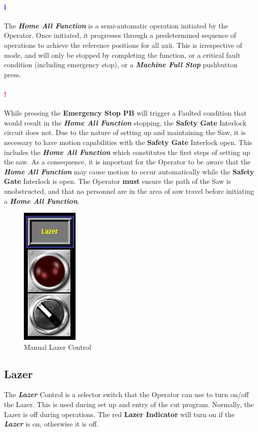 \paragraph*{\textbf{\LARGE \textcolor{blue}{i}}}The \textbf{\textit{Home All Function}} is a semi-automatic operation initiated by the Operator. Once initiated, it progresses through a predetermined sequence of operations to achieve the reference positions for all axii. This is irrespective of mode, and will only be stopped by completing the function, or a critical fault condition (including emergency stop), or a \textbf{\textit{Machine Full Stop}} pushbutton press.
\paragraph*{\textbf{{\LARGE \textcolor{red}{!}}}} While pressing the \textbf{Emergency Stop PB} will trigger a Faulted condition that would result in the \textbf{\textit{Home All Function}} stopping, the \textbf{Safety Gate} Interlock circuit does not. Due to the nature of setting up and maintaining the Saw, it is necessary to have motion capabilities with the \textbf{Safety Gate} Interlock open. This includes the \textbf{\textit{Home All Function}} which constitutes the first steps of setting up the saw. As a consequence, it is important for the Operator to be aware that the \textbf{\textit{Home All Function}} may cause motion to occur automatically while the \textbf{Safety Gate} Interlock is open. The Operator \textbf{must} ensure the path of the Saw is unobstructed, and that no personnel are in the area of saw travel before initiating a \textbf{\textit{Home All Function}}.
\pagebreak
\begin{figure}
	\centering
	\includegraphics[width=.2\linewidth]{screen-captures/manual-lazer}
	\caption{Manual Lazer Control}
	\label{fig:manual-lazer}
\end{figure}
\subsection{Lazer} The \textbf{\textit{Lazer}} Control is a selector switch that the Operator can use to turn on/off the Lazer. This is used during set up and entry of the cut program. Normally, the Lazer is off during operations. The red \textbf{Lazer Indicator} will turn on if the \textbf{\textit{Lazer}} is on, otherwise it is off.
